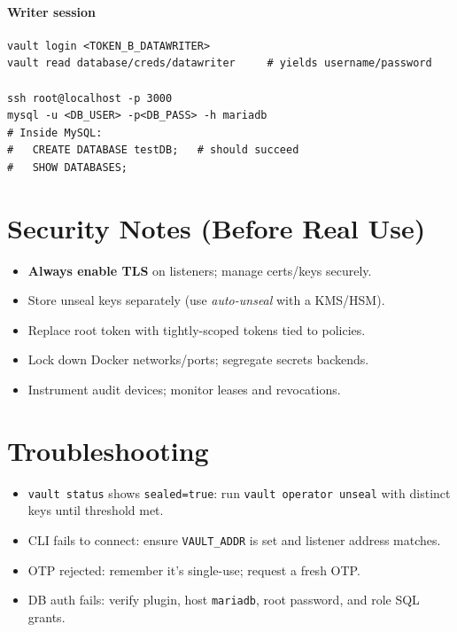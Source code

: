 \documentclass[11pt]{article}
\begin{document}
\paragraph{Writer session}
\begin{verbatim}
vault login <TOKEN_B_DATAWRITER>
vault read database/creds/datawriter     # yields username/password

ssh root@localhost -p 3000
mysql -u <DB_USER> -p<DB_PASS> -h mariadb
# Inside MySQL:
#   CREATE DATABASE testDB;   # should succeed
#   SHOW DATABASES;
\end{verbatim}

\section{Security Notes (Before Real Use)}
\begin{itemize}
  \item \textbf{Always enable TLS} on listeners; manage certs/keys securely.
  \item Store unseal keys separately (use \emph{auto-unseal} with a KMS/HSM).
  \item Replace root token with tightly-scoped tokens tied to policies.
  \item Lock down Docker networks/ports; segregate secrets backends.
  \item Instrument audit devices; monitor leases and revocations.
\end{itemize}

\section*{Troubleshooting}
\begin{itemize}
  \item \texttt{vault status} shows \texttt{sealed=true}: run \texttt{vault operator unseal} with distinct keys until threshold met.
  \item CLI fails to connect: ensure \texttt{VAULT\_ADDR} is set and listener address matches.
  \item OTP rejected: remember it's single-use; request a fresh OTP.
  \item DB auth fails: verify plugin, host \texttt{mariadb}, root password, and role SQL grants.
\end{itemize}
\end{document}
